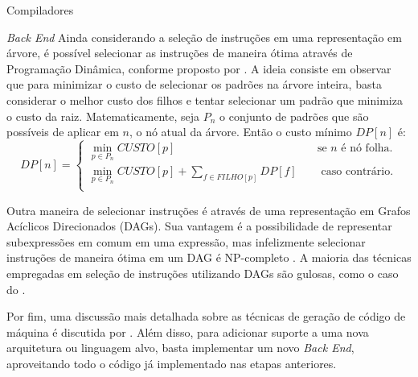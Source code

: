 \begin{section}{Compiladores}
\begin{subsection}{\textit{Back End}}
Ainda considerando a seleção de instruções em uma representação em árvore,
é possível selecionar as instruções de maneira ótima através de Programação
Dinâmica, conforme proposto por \cite{ripken1977formale}.  A ideia consiste em
observar que para minimizar o custo de selecionar os padrões na árvore inteira,
basta considerar o melhor custo dos filhos
e tentar selecionar um padrão que minimiza o custo da raiz. Matematicamente, seja
$P_n$ o conjunto de padrões que são possíveis de aplicar em $n$, o nó atual da árvore.
Então o custo mínimo $DP[n]$ é:
\[
    DP[n] =
     \begin{cases}
       \min_{p \in P_n} CUSTO[p]  &\quad\text{se } n \text{ é nó folha.}\\
       \min_{p \in P_n} CUSTO[p] + \sum_{f \in FILHO[p]} DP[f] &\quad\text{ caso contrário.}\\
     \end{cases}
\]

Outra maneira de selecionar instruções é através de uma representação em 
Grafos Acíclicos Direcionados (DAGs). Sua vantagem é a possibilidade de representar
subexpressões em comum em uma expressão, mas infelizmente selecionar instruções
de maneira ótima em um DAG é NP-completo \citep{koes2008near}.  A maioria das
técnicas empregadas em seleção de instruções utilizando DAGs são gulosas, como
o caso do \cite{llvm_insn_selection}.

Por fim, uma discussão mais detalhada sobre
as técnicas de geração de código de máquina é discutida por
\cite{blindell2016instruction}. Além disso, para
adicionar suporte a uma nova arquitetura ou linguagem
alvo, basta implementar um novo \textit{Back End}, aproveitando todo
o código já implementado nas etapas anteriores.

\end{subsection}


\end{section}


